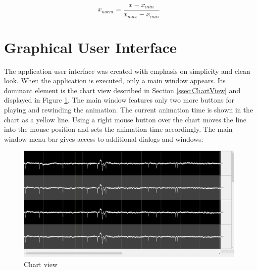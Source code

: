 \begin{equation}
\label{eq:xNorm}
x_{norm} = \frac{x - x_{min}}{x_{max} - x_{min}}
\end{equation}

\section{Graphical User Interface}
\label{sec:GUI}
The application user interface was created with emphasis on simplicity and clean look. When the application is executed, only a main window appears. Its dominant element is the chart view described in Section \ref{ssec:ChartView} and displayed in Figure \ref{fig:chartView}. The main window features only two more buttons for playing and rewinding the animation. The current animation time is shown in the chart as a yellow line. Using a right mouse button over the chart moves the line into the mouse position and sets the animation time accordingly. The main window menu bar gives access to additional dialogs and windows:

\begin{figure}[htb]
	\centering
	\includegraphics[width=1\linewidth]{fig/chartView.png}
	\caption{Chart view}
	\label{fig:chartView}
\end{figure}

